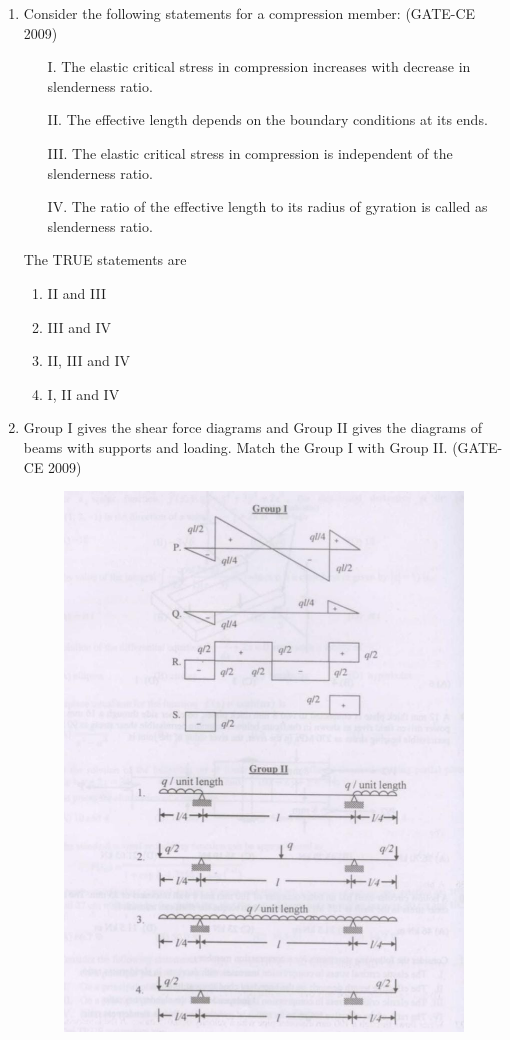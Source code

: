 \documentclass[journal,12pt,onecolumn]{article}
\theoremstyle{remark}
\begin{document}
\begin{enumerate}
    \item Consider the following statements for a compression member: (GATE-CE 2009)
    \begin{itemize}
        \item[I.] The elastic critical stress in compression increases with decrease in slenderness ratio.
        \item[II.] The effective length depends on the boundary conditions at its ends.
        \item[III.] The elastic critical stress in compression is independent of the slenderness ratio.
        \item[IV.] The ratio of the effective length to its radius of gyration is called as slenderness ratio.
    \end{itemize}
    The TRUE statements are \\
    \begin{multicols}{2}
    \begin{enumerate}
        \item II and III 
        \item III and IV 
        \item II, III and IV 
        \item I, II and IV
    \end{enumerate}
\end{multicols}
    
    \item Group I gives the shear force diagrams and Group II gives the diagrams of beams with supports and loading. Match the Group I with Group II. (GATE-CE 2009)

    \begin{figure}[H]
        \centering
        \includegraphics[width=0.7\columnwidth]{figs/image3.jpg}
        \caption{}
        \label{fig:placeholder}
    \end{figure}
    

\end{enumerate}
\end{document}
